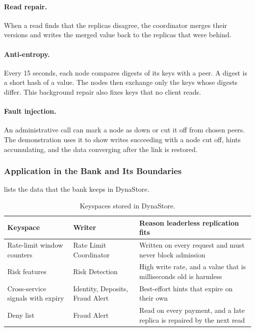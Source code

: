 \documentclass[11pt,a4paper]{article}
\begin{document}
\paragraph{Read repair.} When a read finds that the replicas disagree, the coordinator merges their versions and writes the merged value back to the replicas that were behind.

\paragraph{Anti-entropy.} Every 15 seconds, each node compares digests of its keys with a peer. A digest is a short hash of a value. The nodes then exchange only the keys whose digests differ. This background repair also fixes keys that no client reads.

\paragraph{Fault injection.} An administrative call can mark a node as down or cut it off from chosen peers. The demonstration uses it to show writes succeeding with a node cut off, hints accumulating, and the data converging after the link is restored.

\subsubsection{Application in the Bank and Its Boundaries}

 lists the data that the bank keeps in DynaStore.

\begin{table}[H]\centering\small
\caption{Keyspaces stored in DynaStore.}\label{tab:keyspaces}
\begin{tabularx}{\linewidth}{@{}L{4.0cm}L{3.4cm}Y@{}}
\toprule
Keyspace & Writer & Reason leaderless replication fits \\
\midrule
Rate-limit window counters & Rate Limit Coordinator & Written on every request and must never block admission \\
Risk features & Risk Detection & High write rate, and a value that is milliseconds old is harmless \\
Cross-service signals with expiry & Identity, Deposits, Fraud Alert & Best-effort hints that expire on their own \\
Deny list & Fraud Alert & Read on every payment, and a late replica is repaired by the next read \\
\bottomrule
\end{tabularx}
\end{table}
\end{document}
